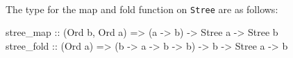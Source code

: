\documentclass[11pt]{article}
\begin{document}


\ \\

The type for the map and fold function on {\tt{Stree}} are as follows:

\begin{program*}

stree\_map :: (Ord b, Ord a) => (a -> b) -> Stree a -> Stree b\\
stree\_fold :: (Ord a) => (b -> a -> b -> b) -> b -> Stree a -> b

\end{program*}
\end{document}
